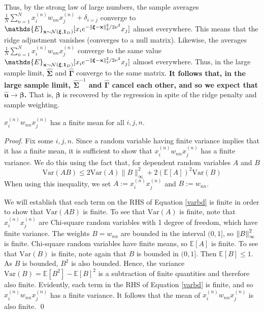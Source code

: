 \documentclass[mnsc,blindrev]{informs3}
\newcommand{\bx}{\mathbf{x}}
\newcommand{\bu}{\mathbf{u}}
\newcommand{\bxi}{\boldsymbol{\xi}}
\newcommand{\bS}{\boldsymbol{\Sigma}}
\newcommand{\bG}{\boldsymbol{\Gamma}}
\begin{document}
    Thus, by the strong law of large numbers, the sample averages $\frac{1}{N}\sum_{n=1}^N x_i^{(n)} w_{nn} x_j^{(n)}+\delta_{i=j}$ converge to $\mathds{E}_{\bx \sim \mathcal{N}(\bxi,\mathbf{1}_{D})}[x_i e^{-\norm{\bxi-\bx}_2^2/2\nu^2}x_j]$ almost everywhere. This means that the ridge adjustment vanishes (converges to a null matrix). Likewise, the averages $\frac{1}{N}\sum_{n=1}^N x_i^{(n)} w_{nn} x_j^{(n)}$ converge to the same value $\mathds{E}_{\bx \sim \mathcal{N}(\bxi,\mathbf{1}_{D})}[x_i e^{-\norm{\bxi-\bx}_2^2/2\nu^2}x_j]$ almost everywhere. Thus, in the large sample limit, $\hat{\bS}$ and $\hat{\bG}$ converge to the same matrix. \textbf{It follows that, in the large sample limit, $\hat{\bS}^{-1}$ and $\hat{\bG}$ cancel each other, and so we expect that $\hat{\bu} \rightarrow \boldsymbol{\beta}$.} That is, $\boldsymbol{\beta}$ is recovered by the regression in spite of the ridge penalty and sample weighting. 
    
    
    
    
   
\begin{lemma}
    \label{finitemean}
   $x_i^{(n)} w_{nn} x_j^{(n)}$ has a finite mean for all $i,j,n$. 
\end{lemma}
    \noindent \emph{Proof.} Fix some $i,j,n$. 
    Since a random variable having finite variance implies that it has a finite mean, it is sufficient to show that $x_i^{(n)} w_{nn} x_j^{(n)}$ has a finite variance. We do this using the fact that, for dependent random variables $A$ and $B$
    \begin{equation}
        \label{varbd}
        \mathrm{Var}(AB) \leq  2\mathrm{Var}(A)\lVert B\rVert_\infty^2+2(\mathbb E[A])^2\mathrm{Var}(B)
    \end{equation}
    When using this inequality, we set $A:=x_i^{(n)} x_j^{(n)}$ and $B:=w_{nn}$.

    We will establish that each term on the RHS of Equation \ref{varbd} is finite in order to show that $\mathrm{Var}(AB)$ is finite. To see that $\mathrm{Var}(A)$ is finite, note that $x_i^{(n)} x_j^{(n)}$ are Chi-square random variables with 1 degree of freedom, which have finite variance. The weights $B=w_{nn}$ are bounded in the interval $(0,1]$, so $\norm{B}_\infty^2$ is finite. Chi-square random variables have finite means, so $\mathds{E}[A]$ is finite. To see that $\mathrm{Var}(B)$ is finite, note again that $B$ is bounded in $(0,1]$. Then $\mathds{E}[B] \leq 1$. As $B$ is bounded, $B^2$ is also bounded. Hence, the variance $\mathrm{Var}(B) = \mathds{E}[B^2]-\mathds{E}[B]^2$ is a subtraction of finite quantities and therefore also finite. Evidently, each term in the RHS of Equation \ref{varbd} is finite, and so $x_i^{(n)} w_{nn} x_j^{(n)}$ has a finite variance. It follows that the mean of $x_i^{(n)} w_{nn} x_j^{(n)}$ is also finite.  \qed
\end{document}
